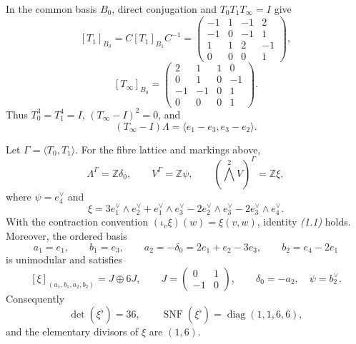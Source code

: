 \documentclass[11pt]{article}
\numberwithin{equation}{section}
\begin{document}
In the common basis $B_0$, direct conjugation and
$T_0T_1T_\infty=I$ give
\[
 [T_1]_{B_0}=C[T_1]_{B_1}C^{-1}=
 \begin{pmatrix}
 -1&1&-1&2\\-1&0&-1&1\\1&1&2&-1\\0&0&0&1
 \end{pmatrix},                                                   \tag{1.6}
\]
\[
 [T_\infty]_{B_0}=
 \begin{pmatrix}
 2&1&1&0\\0&1&0&-1\\-1&-1&0&1\\0&0&0&1
 \end{pmatrix}.                                                   \tag{1.7}
\]
Thus $T_0^3=T_1^4=I$, $(T_\infty-I)^2=0$, and
\[
 (T_\infty-I)\Lambda
   =\langle e_1-e_3,e_3-e_2\rangle.                               \tag{1.8}
\]

\begin{theorem}
Let $\Gamma=\langle T_0,T_1\rangle$.  For the fibre lattice and markings
above,
\[
 \Lambda^\Gamma=\mathbb Z\delta_0,
 \qquad V^\Gamma=\mathbb Z\psi,
 \qquad (\textstyle\bigwedge^2 V)^\Gamma=\mathbb Z\xi,             \tag{1.9}
\]
where $\psi=e_4^\vee$ and
\[
 \xi=3e_1^\vee\wedge e_2^\vee+e_1^\vee\wedge e_3^\vee
      -2e_2^\vee\wedge e_3^\vee-2e_3^\vee\wedge e_4^\vee.       \tag{1.10}
\]
With the contraction convention
$(\iota_v\xi)(w)=\xi(v,w)$, identity \emph{(1.1)} holds.  Moreover, the
ordered basis
\[
 a_1=e_1,\qquad b_1=e_3,\qquad
 a_2=-\delta_0=2e_1+e_2-3e_3,\qquad b_2=e_4-2e_1             \tag{1.11}
\]
is unimodular and satisfies
\[
 [\xi]_{(a_1,b_1,a_2,b_2)}=J\oplus6J,\qquad
 J=\begin{pmatrix}0&1\\-1&0\end{pmatrix},\qquad
 \delta_0=-a_2,\quad\psi=b_2^\vee.                             \tag{1.12}
\]
Consequently
\[
 \det(\xi^\flat)=36,\qquad
 \operatorname{SNF}(\xi^\flat)=\operatorname{diag}(1,1,6,6),     \tag{1.13}
\]
and the elementary divisors of $\xi$ are $(1,6)$.
\end{theorem}
\end{document}
